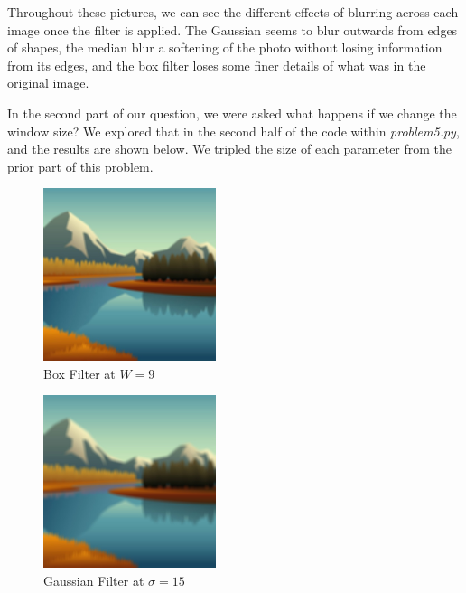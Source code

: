 \documentclass{article}
\begin{document}
Throughout these pictures, we can see the different effects of blurring across each image once the filter is applied. The Gaussian seems to blur outwards from edges of shapes, the median blur a softening of the photo without losing information from its edges, and the box filter loses some finer details of what was in the original image.

In the second part of our question, we were asked what happens if we change the window size? We explored that in the second half of the code within \textit{problem5.py}, and the results are shown below. We tripled the size of each parameter from the prior part of this problem.

\begin{figure}[H]
    \centering
    \includegraphics[width = 0.45\textwidth]{imgs/3x_box_filtered_artwork.jpg}
    \caption{Box Filter at $W=9$}
    \label{fig:3x_box}
\end{figure}

\begin{figure}[H]
    \centering
    \includegraphics[width = 0.45\textwidth]{imgs/3x_gaussian_artwork.jpg}
    \caption{Gaussian Filter at $\sigma=15$}
    \label{fig:3x_gaussian}
\end{figure}
\end{document}
